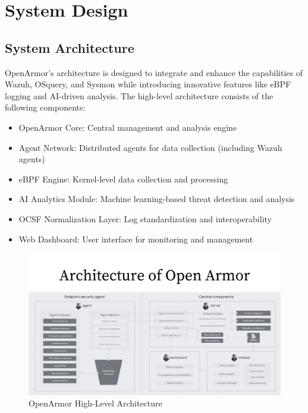 \chapter{System Design}

\section{System Architecture}
OpenArmor's architecture is designed to integrate and enhance the capabilities of Wazuh, OSquery, and Sysmon while introducing innovative features like eBPF logging and AI-driven analysis. The high-level architecture consists of the following components:

\begin{itemize}
    \item OpenArmor Core: Central management and analysis engine
    \item Agent Network: Distributed agents for data collection (including Wazuh agents)
    \item eBPF Engine: Kernel-level data collection and processing
    \item AI Analytics Module: Machine learning-based threat detection and analysis
    \item OCSF Normalization Layer: Log standardization and interoperability
    \item Web Dashboard: User interface for monitoring and management
\end{itemize}

\begin{figure}[h]
    \centering
    \includegraphics[width=1\linewidth]{OpenArmor_Architecture.png}
    \caption{OpenArmor High-Level Architecture}
    \label{fig:openarmor-architecture}
\end{figure}

